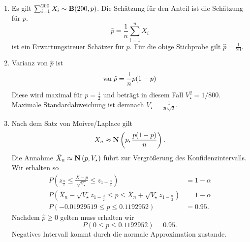 \solution 
\begin{enumerate}
    \item Es gilt $\sum_{i=1}^{200} X_i \sim \mathbf B(200, p)$. Die Schätzung für
        den Anteil ist die Schätzung für $p$. 
        \begin{equation*}
            \hat p = \frac{1}{n} \sum_{i=1}^{n} X_i
        \end{equation*}
        ist ein Erwartungstreuer Schätzer für $p$. Für die obige Stichprobe
        gilt $\hat p = \frac{1}{20}$.
    \item Varianz von $\hat p$ ist 
        \begin{equation*}
            \operatorname{var} \hat p = \frac{1}{n} p(1-p)
        \end{equation*}
        Diese wird maximal für $p=\frac{1}{2}$ und beträgt in diesem Fall
        $V^{2}_{\star} = 1/800$. Maximale Standardabweichung ist demnach
        $V_{\star} = \frac{1}{20\sqrt{2}}$.
    \item Nach dem Satz von Moivre/Laplace gilt 
        \begin{equation*}
            \bar X_{n} \approx \mathbf N \left( p, \frac{p(1-p)}{n} \right).
        \end{equation*}
        Die Annahme $\bar X_{n} \approx \mathbf N\left( p, V_{\star} \right)$ führt zur 
        Vergrößerung des Konfidenzintervalls. Wir erhalten so
        \begin{align*}
            P\left( z_{\frac{\alpha}{2}} \leq \frac{\bar X - p }{\sqrt{V_{\star}}} \leq z_{1- \frac{\alpha}{2}} \right) &=1-\alpha \\
            P\left( \bar X_{n} -  \sqrt{V_{\star}} z_{1-\frac{\alpha}{2}} \leq p
            \leq \bar X_{n} + \sqrt{V_{\star}} z_{1-\frac{\alpha}{2}}\right) &= 1-\alpha \\
            P\left(  -0.01929519 \leq p \leq 0.1192952  \right) &= 0.95.
        \end{align*}
        Nachdem $\hat p \geq 0$ gelten muss erhalten wir
        \begin{equation*}
            P\left(  0 \leq p \leq 0.1192952  \right) = 0.95.
        \end{equation*}
        Negatives Intervall kommt durch die normale Approximation zustande. 
\end{enumerate}


